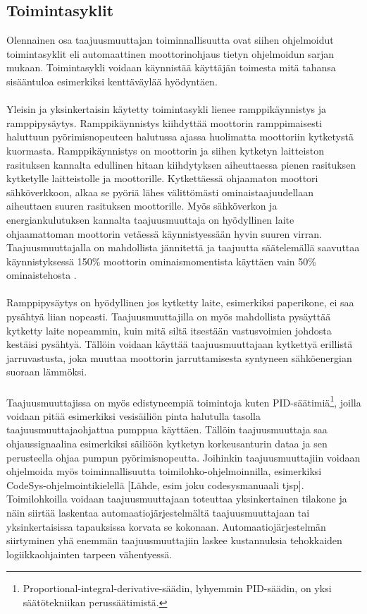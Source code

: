 \documentclass[finnish,12pt,a4paper,pdftex,elec,utf8]{aaltothesis}
\begin{document}
\subsection{Toimintasyklit}
Olennainen osa taajuusmuuttajan toiminnallisuutta ovat siihen ohjelmoidut toimintasyklit eli automaattinen moottorinohjaus tietyn ohjelmoidun sarjan mukaan. Toimintasykli voidaan käynnistää käyttäjän toimesta mitä tahansa sisääntuloa esimerkiksi kenttäväylää hyödyntäen. 
\\\\
Yleisin ja yksinkertaisin käytetty toimintasykli lienee ramppikäynnistys ja ramppipysäytys. Ramppikäynnistys kiihdyttää moottorin ramppimaisesti haluttuun pyörimisnopeuteen halutussa ajassa huolimatta moottoriin kytketystä kuormasta.
Ramppikäynnistys on moottorin ja siihen kytketyn laitteiston rasituksen kannalta edullinen hitaan kiihdytyksen aiheuttaessa pienen rasituksen kytketylle laitteistolle ja moottorille. Kytkettäessä ohjaamaton moottori sähköverkkoon, alkaa se pyöriä lähes välittömästi ominaistaajuudellaan aiheuttaen suuren rasituksen moottorille. Myös sähköverkon ja energiankulutuksen kannalta taajuusmuuttaja on hyödyllinen laite ohjaamattoman moottorin vetäessä käynnistyessään hyvin suuren virran. Taajuusmuuttajalla on mahdollista jännitettä ja taajuutta säätelemällä saavuttaa käynnistyksessä 150\% moottorin ominaismomentista käyttäen vain 50\% ominaistehosta \cite{ABBtechnicalguide}.
\\\\
Ramppipysäytys on hyödyllinen jos kytketty laite, esimerkiksi paperikone, ei saa pysähtyä liian nopeasti. Taajuusmuuttajilla on myös mahdollista pysäyttää kytketty laite nopeammin, kuin mitä siltä itsestään vastusvoimien johdosta kestäisi pysähtyä. Tällöin voidaan käyttää taajuusmuuttajaan kytkettyä erillistä jarruvastusta, joka muuttaa moottorin jarruttamisesta syntyneen sähköenergian suoraan lämmöksi\cite{ABBtechnicalguide}.
\\\\
Taajuusmuuttajissa on myös edistyneempiä toimintoja kuten PID-säätimiä\footnote{Proportional-integral-derivative-säädin, lyhyemmin PID-säädin, on yksi säätötekniikan perussäätimistä.}, joilla voidaan pitää esimerkiksi vesisäiliön pinta halutulla tasolla taajuusmuuttajaohjattua pumppua käyttäen. Tällöin taajuusmuuttaja saa ohjaussignaalina esimerkiksi säiliöön kytketyn korkeusanturin dataa ja sen perusteella ohjaa pumpun pyörimisnopeutta. Joihinkin taajuusmuuttajiin voidaan ohjelmoida myös toiminnallisuutta toimilohko-ohjelmoinnilla, esimerkiksi CodeSys-ohjelmointikielellä [Lähde, esim joku codesysmanuaali tjsp]. Toimilohkoilla voidaan taajuusmuuttajaan toteuttaa yksinkertainen tilakone ja näin siirtää laskentaa automaatiojärjestelmältä taajuusmuuttajaan tai yksinkertaisissa tapauksissa korvata se kokonaan. Automaatiojärjestelmän siirtyminen yhä enemmän taajuusmuuttajiin laskee kustannuksia tehokkaiden logiikkaohjainten tarpeen vähentyessä.
\end{document}
